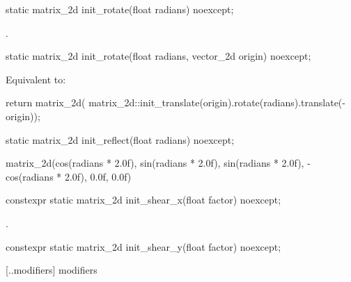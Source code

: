 %
\begin{itemdecl}
static matrix_2d init_rotate(float radians) noexcept;
\end{itemdecl}
\begin{itemdescr}
\pnum
\returns
{}.
\end{itemdescr}

%
\begin{itemdecl}
static matrix_2d init_rotate(float radians, vector_2d origin) noexcept;
\end{itemdecl}
\begin{itemdescr}
\pnum
\effects
Equivalent to:
\begin{codeblock}
return matrix_2d(
  matrix_2d::init_translate(origin).rotate(radians).translate(-origin));
\end{codeblock}
\end{itemdescr}

%
\begin{itemdecl}
static matrix_2d init_reflect(float radians) noexcept;
\end{itemdecl}
\begin{itemdescr}
\pnum
\returns
\begin{codeblock}
\end{codeblock}
matrix_2d(cos(radians * 2.0f), sin(radians * 2.0f), sin(radians * 2.0f),
  -cos(radians * 2.0f), 0.0f, 0.0f)
\end{itemdescr}

%
\begin{itemdecl}
constexpr static matrix_2d init_shear_x(float factor) noexcept;
\end{itemdecl}
\begin{itemdescr}
\pnum
\returns
{}.
\end{itemdescr}

%
\begin{itemdecl}
constexpr static matrix_2d init_shear_y(float factor) noexcept;
\end{itemdecl}
\begin{itemdescr}
\pnum
\returns
{}
\end{itemdescr}

 [\iotwod.\matrixtwod.modifiers] { modifiers}

